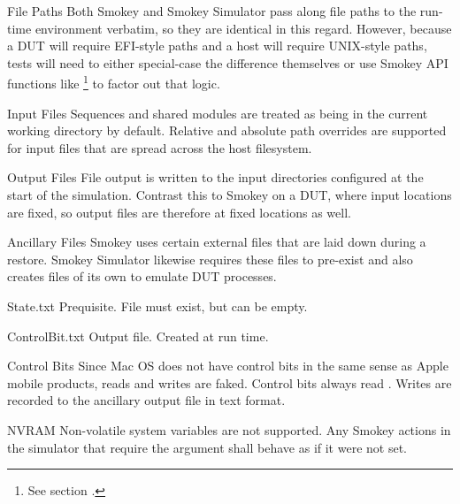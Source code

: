 \begin{Definition}

\item[File Paths] Both Smokey and Smokey Simulator pass along file paths to the
run-time environment verbatim, so they are identical in this regard.  However,
because a DUT will require EFI-style paths and a host will require UNIX-style
paths, tests will need to either special-case the difference themselves or use
Smokey API functions like \footnote{See section
.\label{fn:DiffApi}} to factor out that logic.

\item[Input Files] Sequences and shared modules are treated as being in the
current working directory by default.  Relative and absolute path overrides are
supported for input files that are spread across the host filesystem.

\item[Output Files] File output is written to the input directories configured
at the start of the simulation. Contrast this to Smokey on a DUT, where input
locations are fixed, so output files are therefore at fixed locations as well.

\item[Ancillary Files] Smokey uses certain external files that are laid down
during a restore.  Smokey Simulator likewise requires these files to pre-exist
and also creates files of its own to emulate DUT processes.

	\begin{Definition}

	\item[State.txt] Prequisite.  File must exist, but can be empty.

	\item[ControlBit.txt] Output file.  Created at run time.

	\end{Definition}

\item[Control Bits] Since Mac OS does not have control bits in the same sense
as Apple mobile products, reads and writes are faked.  Control bits always read
.  Writes are recorded to the ancillary output file
 in text format.

\item[NVRAM] Non-volatile system variables are not supported.  Any Smokey
actions in the simulator that require the  argument shall behave
as if it were not set.


\end{Definition}
